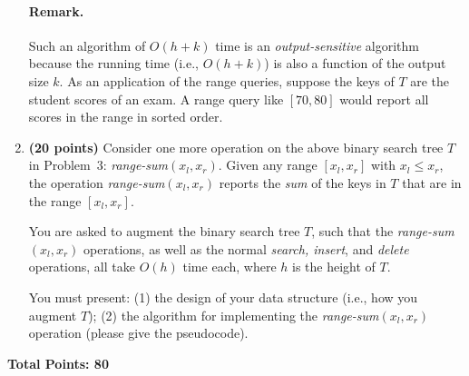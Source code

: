 \documentclass[11pt]{article}
\begin{document}
\begin{enumerate}
\paragraph{Remark.} Such an algorithm of $O(h+k)$ time is an {\em output-sensitive} algorithm because the running time (i.e., $O(h+k)$) is also a function of the output size $k$.
As an application of the range queries, suppose the keys of $T$ are the student scores of an exam. A range query like $[70,80]$ would report all scores in the range in sorted order.

\item
{\bf (20 points)}
Consider one more operation on the above binary search tree $T$ in Problem~3: {\em range-sum}$(x_l,x_r)$. Given any range $[x_l,x_r]$ with $x_l\leq x_r$,  the operation {\em range-sum}$(x_l,x_r)$ reports the {\em sum} of the keys in $T$ that are in the range $[x_l,x_r]$.

You are asked to augment the binary search tree $T$, such that the {\em range-sum}$(x_l,x_r)$ operations, as well as the normal {\em search, insert}, and {\em delete} operations, all take $O(h)$ time each, where $h$ is the height of $T$.

You must present: (1) the design of your data structure (i.e., how you augment $T$); (2) the algorithm for implementing the {\em range-sum}$(x_l,x_r)$ operation (please give the pseudocode).
\end{enumerate}


{\bf Total Points: 80}
\end{document}
